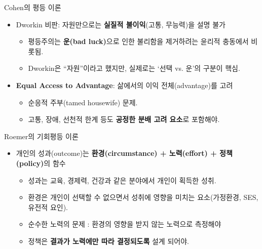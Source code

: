 \documentclass[aspectratio=169,xcolor=dvipsnames,handout]{beamer}
\begin{document}
\begin{frame}{Cohen의 평등 이론}
  \begin{itemize}
    \item Dworkin 비판: 자원만으로는 \textbf{실질적 불이익}(고통, 무능력)을 설명 불가
    \begin{itemize}
        \item 평등주의는 \textbf{운(bad luck)}으로 인한 불리함을 제거하려는 윤리적 충동에서 비롯됨.
        \item Dworkin은 “자원”이라고 했지만, 실제로는 ‘선택 vs. 운’의 구분이 핵심.
    \end{itemize}
    \item \textbf{Equal Access to Advantage}: 삶에서의 이익 전체(advantage)를 고려
    \begin{itemize}
            \item 순응적 주부(tamed housewife) 문제.
            \item 고통, 장애, 선천적 한계 등도 \textbf{공정한 분배 고려 요소}로 포함해야.
    \end{itemize}
  \end{itemize}
\end{frame}

\begin{frame}{Roemer의 기회평등 이론}
  \begin{itemize}
    \item 개인의 성과(outcome)는 \textbf{환경(circumstance) + 노력(effort) + 정책(policy)}의 함수
    \begin{itemize}
        \item 성과는 교육, 경제력, 건강과 같은 분야에서 개인이 획득한 성취.
        \item 환경은 개인이 선택할 수 없으면서 성취에 영향을 미치는 요소(가정환경, SES, 유전적 요인).
        \item 순수한 노력의 문제 : 환경의 영향을 받지 않는 노력으로 측정해야
        \item 정책은 \textbf{결과가 노력에만 따라 결정되도록} 설계 되어야.
    \end{itemize}
  \end{itemize}
\end{frame}
\end{document}
